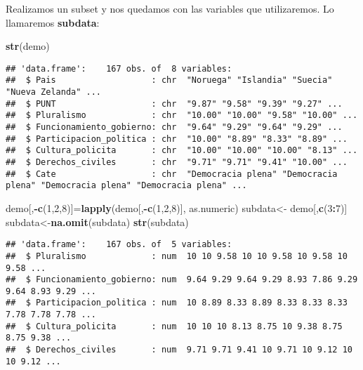 \documentclass[
]{article}
\newenvironment{Shaded}{\begin{snugshade}}{\end{snugshade}}
\newcommand{\DecValTok}[1]{\textcolor[rgb]{0.00,0.00,0.81}{#1}}
\newcommand{\KeywordTok}[1]{\textcolor[rgb]{0.13,0.29,0.53}{\textbf{#1}}}
\newcommand{\NormalTok}[1]{#1}
\newcommand{\OperatorTok}[1]{\textcolor[rgb]{0.81,0.36,0.00}{\textbf{#1}}}
\newcommand{\StringTok}[1]{\textcolor[rgb]{0.31,0.60,0.02}{#1}}
\begin{document}
Realizamos un subset y nos quedamos con las variables que utilizaremos.
Lo llamaremos \textbf{subdata}:

\begin{Shaded}
\begin{Highlighting}[]
\KeywordTok{str}\NormalTok{(demo)}
\end{Highlighting}
\end{Shaded}

\begin{verbatim}
## 'data.frame':    167 obs. of  8 variables:
##  $ Pais                   : chr  "Noruega" "Islandia" "Suecia" "Nueva Zelanda" ...
##  $ PUNT                   : chr  "9.87" "9.58" "9.39" "9.27" ...
##  $ Pluralismo             : chr  "10.00" "10.00" "9.58" "10.00" ...
##  $ Funcionamiento_gobierno: chr  "9.64" "9.29" "9.64" "9.29" ...
##  $ Participacion_politica : chr  "10.00" "8.89" "8.33" "8.89" ...
##  $ Cultura_policita       : chr  "10.00" "10.00" "10.00" "8.13" ...
##  $ Derechos_civiles       : chr  "9.71" "9.71" "9.41" "10.00" ...
##  $ Cate                   : chr  "Democracia plena" "Democracia plena" "Democracia plena" "Democracia plena" ...
\end{verbatim}

\begin{Shaded}
\begin{Highlighting}[]
\NormalTok{demo[,}\OperatorTok{-}\KeywordTok{c}\NormalTok{(}\DecValTok{1}\NormalTok{,}\DecValTok{2}\NormalTok{,}\DecValTok{8}\NormalTok{)]=}\KeywordTok{lapply}\NormalTok{(demo[,}\OperatorTok{-}\KeywordTok{c}\NormalTok{(}\DecValTok{1}\NormalTok{,}\DecValTok{2}\NormalTok{,}\DecValTok{8}\NormalTok{)], as.numeric)}
\NormalTok{subdata<-}\StringTok{ }\NormalTok{demo[,}\KeywordTok{c}\NormalTok{(}\DecValTok{3}\OperatorTok{:}\DecValTok{7}\NormalTok{)]}
\NormalTok{subdata<-}\KeywordTok{na.omit}\NormalTok{(subdata)}
\KeywordTok{str}\NormalTok{(subdata)}
\end{Highlighting}
\end{Shaded}

\begin{verbatim}
## 'data.frame':    167 obs. of  5 variables:
##  $ Pluralismo             : num  10 10 9.58 10 10 9.58 10 9.58 10 9.58 ...
##  $ Funcionamiento_gobierno: num  9.64 9.29 9.64 9.29 8.93 7.86 9.29 9.64 8.93 9.29 ...
##  $ Participacion_politica : num  10 8.89 8.33 8.89 8.33 8.33 8.33 7.78 7.78 7.78 ...
##  $ Cultura_policita       : num  10 10 10 8.13 8.75 10 9.38 8.75 8.75 9.38 ...
##  $ Derechos_civiles       : num  9.71 9.71 9.41 10 9.71 10 9.12 10 10 9.12 ...
\end{verbatim}
\end{document}
